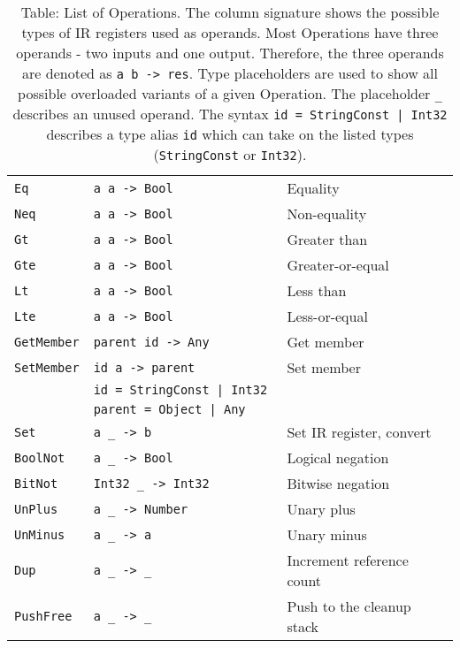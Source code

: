 \begin{table}
\begin{tabular}{l | l | l}
        \texttt{Eq}          & \texttt{a      a     -> Bool     } &  Equality                   \\
        \texttt{Neq}         & \texttt{a      a     -> Bool     } &  Non-equality               \\
        \texttt{Gt}          & \texttt{a      a     -> Bool     } &  Greater than               \\
        \texttt{Gte}         & \texttt{a      a     -> Bool     } &  Greater-or-equal           \\
        \texttt{Lt}          & \texttt{a      a     -> Bool     } &  Less than                  \\
        \texttt{Lte}         & \texttt{a      a     -> Bool     } &  Less-or-equal              \\
        \texttt{GetMember}   & \texttt{parent id    -> Any      } &  Get member                 \\
        \texttt{SetMember}   & \texttt{id     a     -> parent   } &  Set member                 \\
                             & \texttt{id = StringConst | Int32 } &                             \\
                             & \texttt{parent = Object | Any    } &                             \\
        \texttt{Set}         & \texttt{a      \_    -> b        } &  Set IR register, convert   \\
        \texttt{BoolNot}     & \texttt{a      \_    -> Bool     } &  Logical negation           \\
        \texttt{BitNot}      & \texttt{Int32  \_    -> Int32    } &  Bitwise negation           \\
        \texttt{UnPlus}      & \texttt{a      \_    -> Number   } &  Unary plus                 \\
        \texttt{UnMinus}     & \texttt{a      \_    -> a        } &  Unary minus                \\
        \texttt{Dup}         & \texttt{a      \_    -> \_       } &  Increment reference count  \\
        \texttt{PushFree}    & \texttt{a      \_    -> \_       } &  Push to the cleanup stack  \\
    \end{tabular}
    \caption{Table: List of Operations. The column signature shows the possible types of IR registers used as operands. Most Operations have three operands - two inputs and one output. Therefore, the three operands are denoted as \texttt{a b -> res}. Type placeholders are used to show all possible overloaded variants of a given Operation. The placeholder \texttt{\_} describes an unused operand. The syntax \texttt{id = StringConst | Int32} describes a type alias \texttt{id} which can take on the listed types (\texttt{StringConst} or \texttt{Int32}). }
    \label{tab:opcodes}
\end{table}

